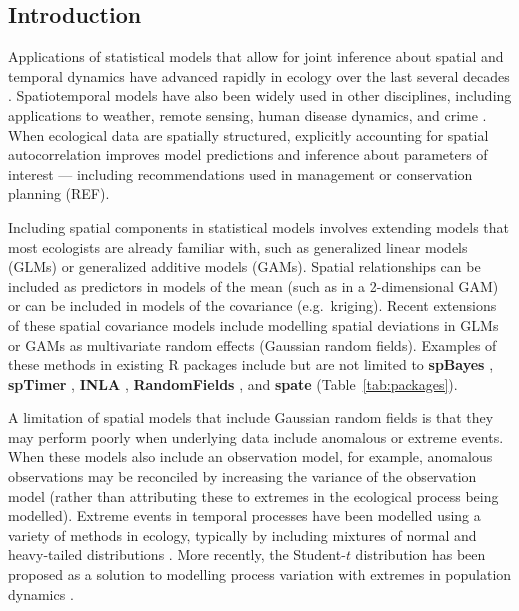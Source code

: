 \documentclass[12pt,english]{article}
\begin{document}
\begin{spacing}{1.3}
\section{Introduction}


Applications of statistical models that allow for joint inference about spatial
and temporal dynamics have advanced rapidly in ecology over the last several
decades \citep[e.g.][]{bascompte1995, latimer2009}. Spatiotemporal models have
also been widely used in other disciplines, including applications to weather,
remote sensing, human disease dynamics, and crime \citep{cressie2011}. When
ecological data are spatially structured, explicitly accounting for spatial
autocorrelation improves model predictions and inference about parameters of
interest --- including recommendations used in management or conservation
planning (REF).

Including spatial components in statistical models involves extending models
that most ecologists are already familiar with, such as generalized linear
models (GLMs) or generalized additive models (GAMs). Spatial relationships can
be included as predictors in models of the mean (such as in a 2-dimensional
GAM) or can be included in models of the covariance (e.g.\ kriging). Recent
extensions of these spatial covariance models include modelling spatial
deviations in GLMs or GAMs as multivariate random effects (Gaussian random
fields). Examples of these methods in existing R packages include but are not
limited to \textbf{spBayes} \citep{finley2007}, \textbf{spTimer}
\citep{bakar2015}, \textbf{INLA} \citep{rue2009}, \textbf{RandomFields}
\citep{schlather2016}, and \textbf{spate} \citep{sigrist2015}
(Table~\ref{tab:packages}).

A limitation of spatial models that include Gaussian random fields is that they
may perform poorly when underlying data include anomalous or extreme events.
When these models also include an observation model, for example, anomalous
observations may be reconciled by increasing the variance of the observation
model (rather than attributing these to extremes in the ecological process
being modelled). Extreme events in temporal processes have been modelled using a
variety of methods in ecology, typically by including mixtures of normal and
heavy-tailed distributions \citep[e.g.][]{everitt1996, ward2007, thorson2011}.
More recently, the Student-$t$ distribution has been proposed as a
solution to modelling process variation with extremes in population dynamics
\citep{anderson2017}.


\end{spacing}
\end{document}
